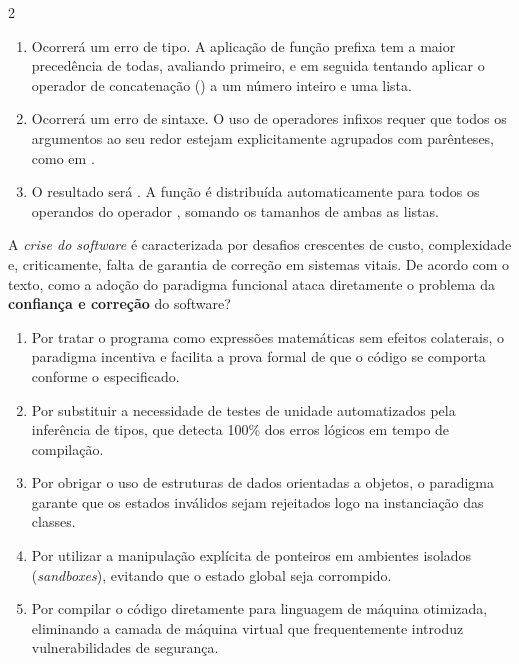 \documentclass[a4paper,10pt,brazil]{article}
\begin{document}
\begin{multicols}{2}
\begin{enumerate}
  \item Ocorrerá um erro de tipo. A aplicação de função prefixa tem a maior precedência de todas, avaliando  primeiro, e em seguida tentando aplicar o operador de concatenação (\haskellinline{++}) a um número inteiro e uma lista.

  \item Ocorrerá um erro de sintaxe. O uso de operadores infixos requer que todos os argumentos ao seu redor estejam explicitamente agrupados com parênteses, como em .

  \item O resultado será . A função  é distribuída automaticamente para todos os operandos do operador \haskellinline{++}, somando os tamanhos de ambas as listas.


\end{enumerate}

A \emph{crise do software} é caracterizada por desafios crescentes de custo, complexidade e, criticamente, falta de garantia de correção em sistemas vitais. De acordo com o texto, como a adoção do paradigma funcional ataca diretamente o problema da \textbf{confiança e correção} do software?

\begin{enumerate}
  \item Por tratar o programa como expressões matemáticas sem efeitos colaterais, o paradigma incentiva e facilita a prova formal de que o código se comporta conforme o especificado.

  \item Por substituir a necessidade de testes de unidade automatizados pela inferência de tipos, que detecta 100\% dos erros lógicos em tempo de compilação.

  \item Por obrigar o uso de estruturas de dados orientadas a objetos, o paradigma garante que os estados inválidos sejam rejeitados logo na instanciação das classes.

  \item Por utilizar a manipulação explícita de ponteiros em ambientes isolados (\emph{sandboxes}), evitando que o estado global seja corrompido.

  \item Por compilar o código diretamente para linguagem de máquina otimizada, eliminando a camada de máquina virtual que frequentemente introduz vulnerabilidades de segurança.



\end{enumerate}
\end{multicols}
\end{document}
